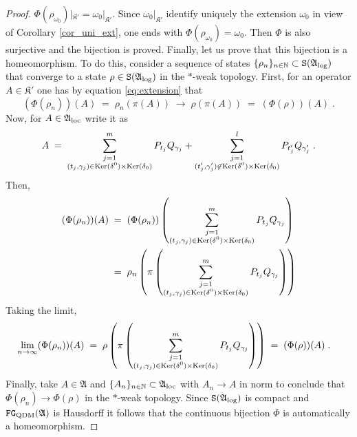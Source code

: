 \documentclass[a4paper,12pt,twoside,reqno]{amsart}
\theoremstyle{plain}
\theoremstyle{definition}
\theoremstyle{remark}
\numberwithin{equation}{section}
\numberwithin{figure}{section}
\numberwithin{table}{section}
\newcommand{\NN}{\mathbb{N}}
\newcommand{\pa}[1]{\left( #1 \right)}
\begin{document}
\begin{proof}
		$\Phi(\rho_{\omega_0})|_{\mathfrak{K}'}= {\omega_0}|_{\mathfrak{K}'}$.
		Since ${\omega_0}|_{\mathfrak{K}'}$ identify uniquely the extension $\omega_0$ in view of Corollary \ref{cor_uni_ext}, one ends with $\Phi(\rho_{\omega_0})=\omega_0$. Then $\Phi$ is also surjective and the bijection is proved.
		Finally, let us prove that this bijection is a homeomorphism. To do this, consider a sequence of states $\{\rho_n\}_{n\in\NN}\subset \mathtt{S}(\mathfrak{A}_{\rm log})$ that converge to a state $\rho\in \mathtt{S}(\mathfrak{A}_{\rm log})$ in the $*$-weak topology. First, for an operator $A\in \mathfrak{K}'$ one has by equation \eqref{eq:extension} that
		$$(\Phi(\rho_n))(A)\;=\;\rho_n(\pi(A))\;\rightarrow\; \rho(\pi(A))\;=\;(\Phi(\rho))(A)\;.
		$$
		Now, for $A\in\mathfrak{A}_{\rm loc}$ write it as 
		$$A\;=\;\sum^m_{\substack{j=1 \\ (t_j,\gamma_j) \in {\rm Ker}(\delta^0) \times {\rm Ker}(\delta_0)}}P_{t_j}Q_{\gamma_j} + \sum^l_{\substack{j=1 \\ (t'_j,\gamma'_j) \not\in {\rm Ker}(\delta^0) \times {\rm Ker}(\delta_0)}}P_{t'_j}Q_{\gamma'_j}\;.$$
		Then,
		\begin{align*}
			(\Phi(\rho_n))(A)\;&=\;(\Phi(\rho_n))\pa{\sum^m_{\substack{j=1 \\ (t_j,\gamma_j) \in {\rm Ker}(\delta^0) \times {\rm Ker}(\delta_0)}} P_{t_j}Q_{\gamma_j}}\\
			&=\;\rho_n\pa{\pi\pa{\sum^m_{\substack{j=1 \\ (t_j,\gamma_j) \in {\rm Ker}(\delta^0) \times {\rm Ker}(\delta_0)}} P_{t_j}Q_{\gamma_j}}}
		\end{align*}
		Taking the limit,
		\begin{align*}
			\lim_{n\to\infty}(\Phi(\rho_n))(A)\;&=\;\rho\pa{\pi\pa{\sum^m_{\substack{j=1 \\ (t_j,\gamma_j) \in {\rm Ker}(\delta^0) \times {\rm Ker}(\delta_0)}} P_{t_j}Q_{\gamma_j}}}\;=\;(\Phi(\rho))(A)\;.
		\end{align*}
		Finally, take $A\in\mathfrak{A}$ and $\{A_n\}_{n\in\NN}\subset\mathfrak{A}_{\rm loc}$ with $A_n\to A$ in norm to conclude that  
		$\Phi(\rho_n)\to\Phi(\rho)$ in the $\ast$-weak topology. Since $\mathtt{S}(\mathfrak{A}_{\rm log})$ is compact and $\mathtt{FG}_{\rm QDM}(\mathfrak{A})$ is Hausdorff it follows that the continuous bijection $\Phi$ is automatically a homeomorphism.
	\end{proof}
	
	
	
	
	
\end{document}
